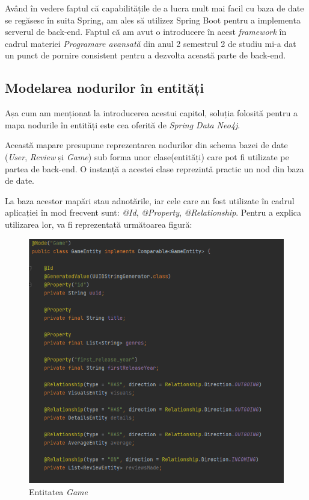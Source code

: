 \documentclass[12pt,a4paper]{report}
\begin{document}
Având în vedere faptul că capabilitățile de a lucra mult mai facil cu baza de date se regăsesc în suita Spring, am ales să utilizez Spring Boot pentru a implementa serverul de back-end. Faptul că am avut o introducere în acest \emph{framework} în cadrul materiei \emph{Programare avansată} din anul 2 semestrul 2 de studiu mi-a dat un punct de pornire consistent pentru a dezvolta această parte de back-end.


\subsection{Modelarea nodurilor în entități}

Așa cum am menționat la introducerea acestui capitol, soluția folosită pentru a mapa nodurile în entități este cea oferită de \emph{Spring Data Neo4j}.

Această mapare presupune reprezentarea nodurilor din schema bazei de date (\emph{User}, \emph{Review} și \emph{Game}) sub forma unor clase(entități) care pot fi utilizate pe partea de back-end. O instanță a acestei clase reprezintă practic un nod din baza de date.

La baza acestor mapări stau adnotările, iar cele care au fost utilizate în cadrul aplicației în mod frecvent sunt: \emph{@Id}, \emph{@Property}, \emph{@Relationship}. Pentru a explica utilizarea lor, va fi reprezentată următoarea figură:

\begin{figure}[H]
\centering
\caption{}
\includegraphics[scale = 0.8]{exemplu_18_adnotari}
\caption*{Entitatea \emph{Game}}
\end{figure}
\end{document}
